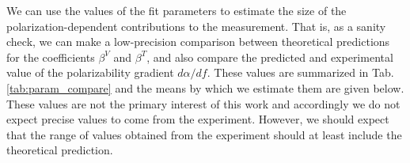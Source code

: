 We can use the values of the fit parameters to estimate the size of the polarization-dependent contributions to the measurement. That is, as a sanity check, we can make a low-precision comparison between theoretical predictions for the coefficients $\beta^V$ and $\beta^T$, and also compare the predicted and experimental value of the polarizability gradient $d\alpha/df$. These values are summarized in Tab. \ref{tab:param_compare} and the means by which we estimate them are given below. These values are not the primary interest of this work and accordingly we do not expect precise values to come from the experiment. However, we should expect that the range of values obtained from the experiment should at least include the theoretical prediction. 



